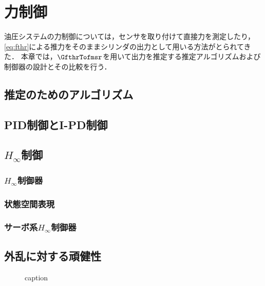 \chapter{力制御}
油圧システムの力制御については，センサを取り付けて直接力を測定したり，\eqnname\ref{eq:fthr}による推力をそのままシリンダの出力として用いる方法がとられてきた\cite{semini2010design,semini2010hyq,川端健太郎20141a1,岡田大貴2017多自由度油圧駆動ロボットのシリンダ圧に基づく手先負荷力推定による力覚フィードバック}．
本章では，$\GfthrTofmsr$を用いて出力を推定する推定アルゴリズムおよび制御器の設計とその比較を行う．

\section{推定のためのアルゴリズム}

\section{PID制御とI-PD制御}

\section{$H_\infty$制御}
\subsection{$H_\infty$制御器}
\subsection{状態空間表現}
\subsection{サーボ系$H_\infty$制御器}

\section{外乱に対する頑健性}

\begin{figure}[t]
    \centering
        
        \caption{caption}
        \label{fig:figlabel}
\end{figure}